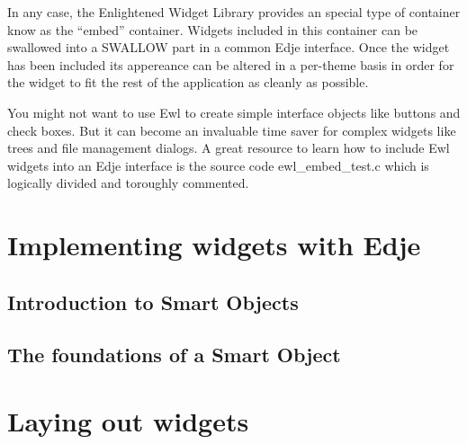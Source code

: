 \documentclass[12pt,a4paper,english]{book}
\begin{document}
In any case, the Enlightened Widget Library provides an special type of
container know as the ``embed'' container. Widgets included in this container can
be swallowed into a SWALLOW part in a common Edje interface. Once the widget
has been included its appereance can be altered in a per-theme basis in order
for the widget to fit the rest of the application as cleanly as possible.

You might not want to use Ewl to create simple interface objects like buttons
and check boxes. But it can become an invaluable time saver for complex widgets
like trees and file management dialogs. A great resource to learn how to
include Ewl widgets into an Edje interface is the source code ewl{\_}embed{\_}test.c
which is logically divided and toroughly commented.



\hypertarget{implementing-widgets-with-edje}{}
\section{Implementing widgets with Edje}



\hypertarget{introduction-to-smart-objects}{}
\subsection{Introduction to Smart Objects}



\hypertarget{the-foundations-of-a-smart-object}{}
\subsection{The foundations of a Smart Object}



\hypertarget{laying-out-widgets}{}
\section{Laying out widgets}



\hypertarget{creating-list-based-widgets}{}
\end{document}
